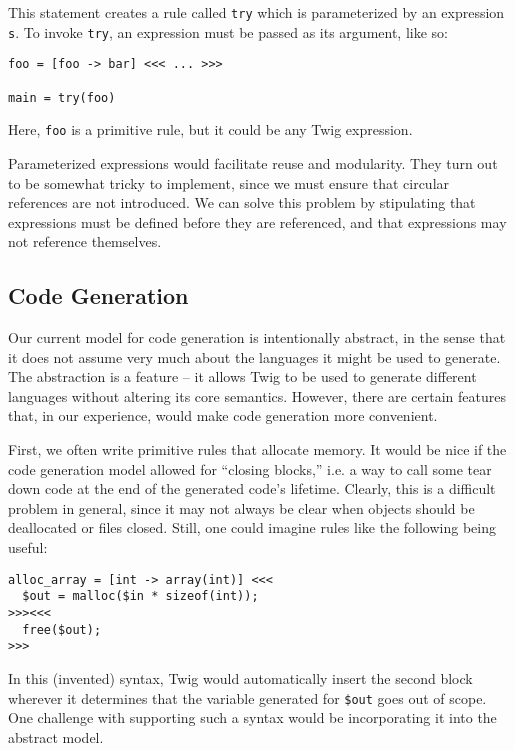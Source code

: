 This statement creates a rule called \texttt{try} which is
parameterized by an expression \texttt{s}. To invoke \texttt{try},
an expression must be passed as its argument, like so:

\begin{verbatim}
foo = [foo -> bar] <<< ... >>>

main = try(foo)
\end{verbatim}

Here, \texttt{foo} is a primitive rule, but it could be any Twig
expression.

Parameterized expressions would facilitate reuse and modularity.
They turn out to be somewhat tricky to implement, since we must
ensure that circular references are not introduced. We can solve
this problem by stipulating that expressions must be defined
before they are referenced, and that expressions may not reference
themselves.

\subsection{Code Generation}
\label{sec:fw:code-gen}

Our current model for code generation is intentionally abstract,
in the sense that it does not assume very much about the languages
it might be used to generate. The abstraction is a feature -- it
allows Twig to be used to generate different languages without
altering its core semantics. However, there are certain features
that, in our experience, would make code generation more
convenient.

First, we often write primitive rules that allocate memory. It
would be nice if the code generation model allowed for ``closing
blocks,'' i.e. a way to call some tear down code at the end of the
generated code's lifetime. Clearly, this is a difficult problem in
general, since it may not always be clear when objects should be
deallocated or files closed. Still, one could imagine rules like
the following being useful:

\begin{verbatim}
alloc_array = [int -> array(int)] <<<
  $out = malloc($in * sizeof(int));
>>><<<
  free($out);
>>>
\end{verbatim}

In this (invented) syntax, Twig would automatically insert the
second block wherever it determines that the variable generated
for \texttt{\$out} goes out of scope. One challenge with
supporting such a syntax would be incorporating it into the
abstract model.

